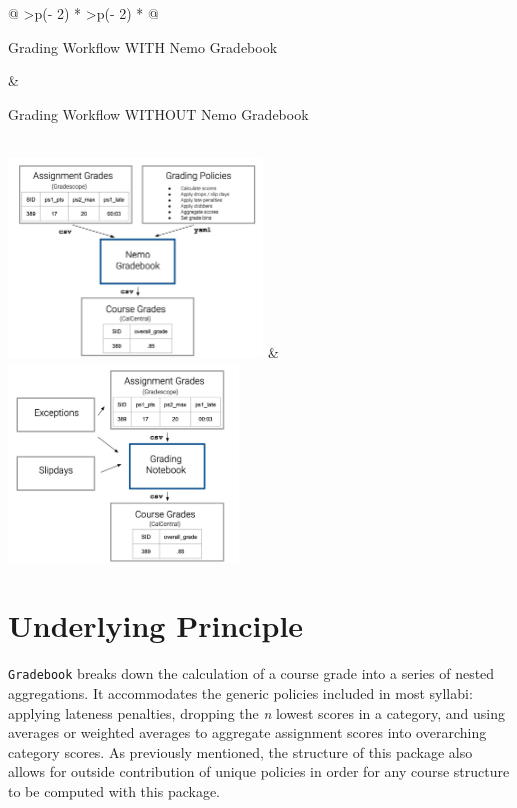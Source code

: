 \documentclass[10pt,a4paper,onecolumn]{article}
\begin{document}
\begin{longtable}[]{@{}
  >{\centering\arraybackslash}p{(\columnwidth - 2\tabcolsep) * }
  >{\centering\arraybackslash}p{(\columnwidth - 2\tabcolsep) * }@{}}
\toprule\noalign{}
\begin{minipage}[b]{\linewidth}\centering
Grading Workflow WITH Nemo Gradebook
\end{minipage} & \begin{minipage}[b]{\linewidth}\centering
Grading Workflow WITHOUT Nemo Gradebook
\end{minipage} \\
\midrule\noalign{}
\endhead
\bottomrule\noalign{}
\endlastfoot
\includegraphics[width=\textwidth,height=2.08333in]{with_nemogb_workflow.png}
&
\includegraphics[width=\textwidth,height=2.08333in]{without_nemogb_workflow.png} \\
\end{longtable}

\section{Underlying Principle}\label{underlying-principle}

\texttt{Gradebook} breaks down the calculation of a course grade into a
series of nested aggregations. It accommodates the generic policies
included in most syllabi: applying lateness penalties, dropping the
\emph{n} lowest scores in a category, and using averages or weighted
averages to aggregate assignment scores into overarching category
scores. As previously mentioned, the structure of this package also
allows for outside contribution of unique policies in order for any
course structure to be computed with this package.
\end{document}
